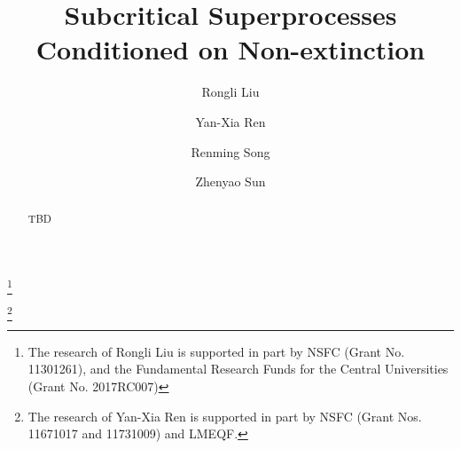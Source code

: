 \documentclass[12pt,a4paper]{amsart}
\numberwithin{equation}{section}
\theoremstyle{plain}
\theoremstyle{definition}
\theoremstyle{remark}
\begin{document}
\title {Subcritical Superprocesses Conditioned on Non-extinction}
\author[R. Liu]{Rongli Liu}
\address{Rongli Liu\\ Mathematics and Applied Mathematics\\ Beijing jiaotong University\\ Beijing 100044\\ P. R. China}
\thanks{The research of Rongli Liu is supported in part by NSFC (Grant No. 11301261), and the Fundamental Research Funds for the Central Universities (Grant No.  2017RC007)}
\author[Y.-X. Ren]{Yan-Xia Ren}
\address{Yan-Xia Ren\\ LMAM School of Mathematical Sciences \& Center for
Statistical Science\\ Peking University\\ Beijing 100871\\ P. R. China}
\thanks{The research of Yan-Xia Ren is supported in part by NSFC (Grant Nos. 11671017 and 11731009)  and LMEQF.}
\author[R. Song]{Renming Song}
\address{Renming Song\\ Department of Mathematics\\ University of Illinois at Urbana-Champaign \\ Urbana \\ IL 61801\\ USA}
\author[Z. Sun]{Zhenyao Sun}
\address{Zhenyao Sun\\ Faculty of Industrial Engineering and Management \\ Technion, Isreal Institute of Technology \\ Haifa 3200003\\ Isreal}
\begin{abstract}
\begin{comment}
Suppose that $E$ is a locally compact separable metric space, and  that  $X =\{(X_t)_{t\geq 0}; (\mathrm P_\mu)_{\mu \in \mathcal M_f(E)}\}$  is a subcritical superprocess, where $\mathcal M_f(E)$ is the space of all finite Borel measures on $E$. Under some conditions on the mean semigroup of $X$, we prove that the the $Q$ process of $X$ exists, and they have equilibrium probability if and only if the moment condition $\int_El(x)\nu({\mathrm d}x)<\infty$ is satisfied.
We also show that the equilibrium probability is a size-biased measure of the Yaglom distribution.
\end{comment}
    TBD
\end{abstract}
\maketitle
\end{document}
